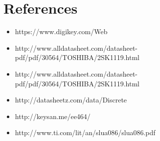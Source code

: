 \documentclass[12pt]{article}
\begin{document}
\section{References}
\begin{itemize}
\item https://www.digikey.com/Web%

\item http://www.alldatasheet.com/datasheet-pdf/pdf/30564/TOSHIBA/2SK1119.html
\item http://www.alldatasheet.com/datasheet-pdf/pdf/30564/TOSHIBA/2SK1119.html
\item http://datasheetz.com/data/Discrete%
\item http://keysan.me/ee464/ 
\item  http://www.ti.com/lit/an/slua086/slua086.pdf
\end{itemize}
\end{document}
